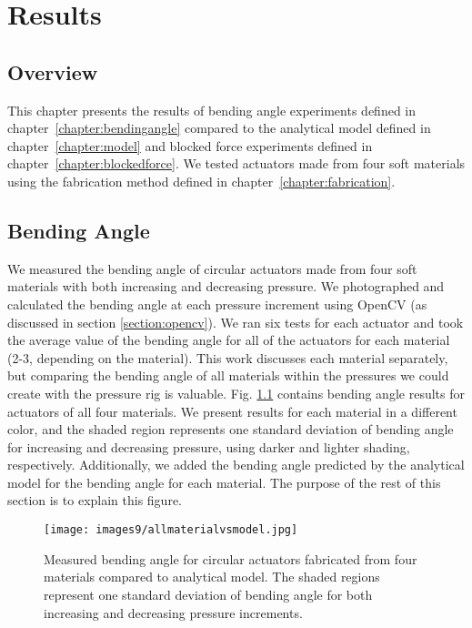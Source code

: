 \chapter{Results}
\label{chapter:results}

\section*{Overview}
This chapter presents the results of bending angle experiments defined in chapter~\ref{chapter:bendingangle} compared to the analytical model defined in chapter~\ref{chapter:model} and blocked force experiments defined in chapter~\ref{chapter:blockedforce}. We tested actuators made from four soft materials using the fabrication method defined in chapter~\ref{chapter:fabrication}.

\section{Bending Angle}

We measured the bending angle of circular actuators made from four soft materials with both increasing and decreasing pressure. We photographed and calculated the bending angle at each pressure increment using OpenCV (as discussed in section \ref{section:opencv}). We ran six tests for each actuator and took the average value of the bending angle for all of the actuators for each material (2-3, depending on the material). This work discusses each material separately, but comparing the bending angle of all materials within the pressures we could create with the pressure rig is valuable. Fig. \ref{fig:allmaterialvsmodel} contains bending angle results for actuators of all four materials. We present results for each material in a different color, and the shaded region represents one standard deviation of bending angle for increasing and decreasing pressure, using darker and lighter shading, respectively. Additionally, we added the bending angle predicted by the analytical model for the bending angle for each material. The purpose of the rest of this section is to explain this figure. 

\begin{figure}[ht]
    \centering
     \texttt{[image: images9/allmaterialvsmodel.jpg]}
    \caption{Measured bending angle for circular actuators fabricated from four materials compared to analytical model. The shaded regions represent one standard deviation of bending angle for both increasing and decreasing pressure increments.}
    \label{fig:allmaterialvsmodel}
\end{figure}

